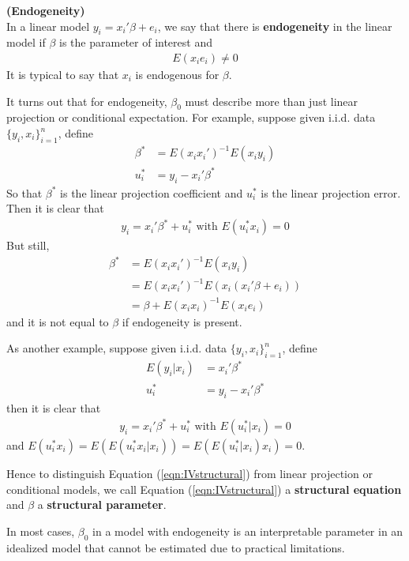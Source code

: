 \documentclass[11pt]{article} %
\theoremstyle{definition}
\numberwithin{defn}{subsection}
\numberwithin{thm}{subsection}
\numberwithin{ex}{subsection}
\begin{document}
\begin{defn}
	\textbf{(Endogeneity)}\\
	In a linear model $y_i=x_i'\beta+e_i$, we say that there is \textbf{endogeneity} in the linear model if $\beta$ is the parameter of interest and
	\begin{align*}
	E(x_ie_i)\neq 0
	\end{align*}
	It is typical to say that $x_i$ is endogenous for $\beta$.
\end{defn}

It turns out that for endogeneity, $\beta_0$ must describe more than just linear projection or conditional expectation. For example, suppose given i.i.d. data $\{y_i,x_i\}_{i=1}^n$, define
\begin{align*}
\beta^*&=E(x_ix_i')^{-1}E(x_iy_i)\\
u_i^*&=y_i-x_i'\beta^*
\end{align*}
So that $\beta^*$ is the linear projection coefficient and $u_i^*$ is the linear projection error. Then it is clear that
\begin{align*}
y_i=x_i'\beta^*+u_i^*\text{ with }E(u_i^*x_i)=0
\end{align*}
But still, 
\begin{align*}
\beta^*&=E(x_ix_i')^{-1}E(x_iy_i)\\
   	   &=E(x_ix_i')^{-1}E(x_i(x_i'\beta+e_i))\\
   	   &=\beta+E(x_ix_i)^{-1}E(x_ie_i)
\end{align*}
and it is not equal to $\beta$ if endogeneity is present.

As another example, suppose given i.i.d. data $\{y_i,x_i\}_{i=1}^n$, define
\begin{align*}
E(y_i|x_i)&=x_i'\beta^*\\
u_i^*&=y_i-x_i'\beta^*
\end{align*}
then it is clear that
\begin{align*}
y_i=x_i'\beta^*+u_i^*\text{ with }E(u_i^*|x_i)=0
\end{align*}
and $E(u_i^*x_i)=E(E(u_i^*x_i|x_i))=E(E(u_i^*|x_i)x_i)=0$.

Hence to distinguish Equation (\ref{eqn:IVstructural}) from linear projection or conditional models, we call Equation (\ref{eqn:IVstructural}) a \textbf{structural equation} and $\beta$ a \textbf{structural parameter}.

In most cases, $\beta_0$ in a model with endogeneity is an interpretable parameter in an idealized model that cannot be estimated due to practical limitations. 
\end{document}
